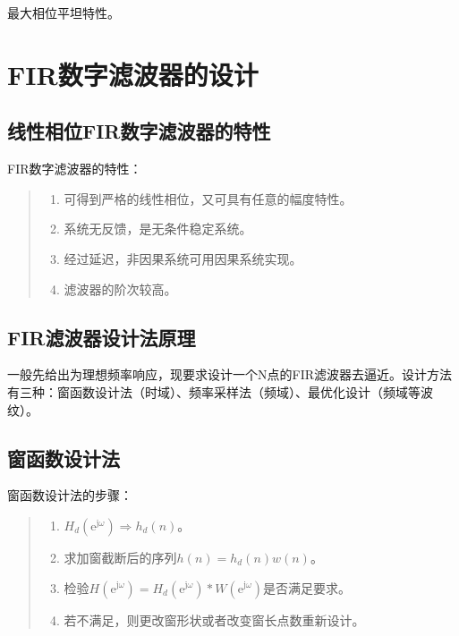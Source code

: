 \documentclass[cn, hazy, blue, normal, 14pt]{elegantnote}
\begin{document}
最大相位平坦特性。

\section{FIR数字滤波器的设计}

\subsection{线性相位FIR数字滤波器的特性}

FIR数字滤波器的特性：

\begin{quote}
\begin{enumerate}
    \item 可得到严格的线性相位，又可具有任意的幅度特性。 
    \item 系统无反馈，是无条件稳定系统。
    \item 经过延迟，非因果系统可用因果系统实现。
    \item 滤波器的阶次较高。
\end{enumerate}
\end{quote}

\subsection{FIR滤波器设计法原理}

一般先给出为理想频率响应，现要求设计一个N点的FIR滤波器去逼近。设计方法有三种：窗函数设计法（时域）、频率采样法（频域）、最优化设计（频域等波纹）。

\subsection{窗函数设计法}

窗函数设计法的步骤：

\begin{quote}
\begin{enumerate}
    \item $H_d(\text{e}^{\text{j}\omega})\Rightarrow h_d(n)$。
    \item 求加窗截断后的序列$h(n)=h_d(n)w(n)$。
    \item 检验$H(\text{e}^{\text{j}\omega})=H_d(\text{e}^{\text{j}\omega})\ast W(\text{e}^{\text{j}\omega})$是否满足要求。
    \item 若不满足，则更改窗形状或者改变窗长点数重新设计。
\end{enumerate}
\end{quote}
\end{document}
